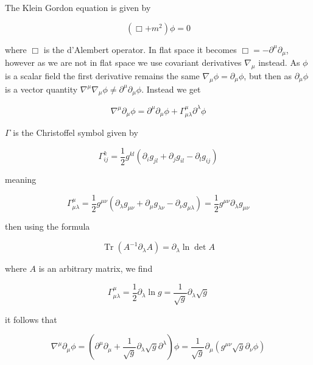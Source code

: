 \documentclass[a4paper,11pt]{article}
\numberwithin{equation}{section}
\numberwithin{figure}{section}
\begin{document}
\begin{large}
The Klein Gordon equation is given by 

\begin{equation}
\label{Klein Gordon}    
    (\Box+m^2)\phi=0
\end{equation}

where $\Box$ is the d'Alembert operator. In flat space it becomes $\Box=-\partial^\mu\partial_\mu$, however as we are not in flat space we use covariant derivatives $\nabla_\mu$ instead. As $\phi$ is a scalar field the first derivative remains the same $\nabla_\mu\phi=\partial_\mu\phi$, but then as $\partial_\mu\phi$ is a vector quantity $\nabla^\mu\nabla_\mu\phi \neq \partial^\mu \partial_\mu\phi$. Instead we get

\begin{equation}
\label{covariant of vector}    
    \nabla^\mu\partial_\mu\phi=\partial^\mu \partial_\mu\phi+ \Gamma^\mu_{\mu\lambda} \partial^\lambda\phi
\end{equation}

$\Gamma$ is the Christoffel symbol given by

\begin{equation}
\label{Christoffel}
    \Gamma^k_{ij}=\frac{1}{2}g^{kl}(\partial_i g_{jl}+\partial_j g_{il}-\partial_l g_{ij})
\end{equation}

meaning 

\begin{equation}
\label{Christoffel1}    
    \Gamma^\mu_{\mu\lambda}=\frac{1}{2}g^{\mu\nu}(\partial_\lambda g_{\mu\nu}+\partial_\mu g_{\lambda\nu}-\partial_\nu g_{\mu\lambda})=\frac{1}{2} g^{\mu\nu}\partial_\lambda g_{\mu\nu}
\end{equation}

then using the formula

\begin{equation}
\label{formula}    
    \operatorname{Tr}(A^{-1}\partial_\lambda A)=\partial_\lambda \ln \det A
\end{equation}

where $A$ is an arbitrary matrix, we find 

\begin{equation}
\label{Christoffel2}    
    \Gamma^\mu_{\mu\lambda}=\frac{1}{2} \partial_\lambda \ln g = \frac{1}{\sqrt{g}}\partial_\lambda \sqrt{g}
\end{equation}

it follows that

\begin{equation}
\label{d'Al}
    \nabla^\mu\partial_\mu\phi=(\partial^\mu\partial_\mu+\frac{1}{\sqrt{g}}\partial_\lambda \sqrt{g}\partial^\lambda)\phi=\frac{1}{\sqrt{g}}\partial_\mu (g^{\mu\nu}\sqrt{g}\partial_\nu \phi)
\end{equation}


\end{large}
\end{document}
